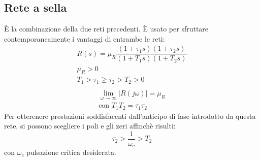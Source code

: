 \documentclass[a4paper]{report}
\begin{document}
\subsection{Rete a sella}
\`E la combinazione della due reti precedenti. \`E usato per sfruttare
contemporaneamente i vantaggi di entrambe le reti:
\begin{equation}
  \begin{array}{l}
  R(s) = \mu_R \dfrac{(1 + \tau_1 s)(1 + \tau_2 s)}{(1 + T_1 s)(1 +
    T_2 s)}\\
  \mu_R > 0\\
  T_1 > \tau_1 \geq \tau_2 > T_2 > 0\\
  \end{array}
\end{equation}
\begin{equation}
  \begin{array}{l}
    \lim_{\omega \to \infty} |R(j \omega)| = \mu_R\\
    \textrm{con } T_1T_2 = \tau_1 \tau_2
  \end{array}
\end{equation}
Per otterenere prestazioni soddisfacenti dall'anticipo di fase
introdotto da questa rete, si possono scegliere i poli e gli zeri
affinch\`e risulti:
\[
\tau_2 > \dfrac{1}{\omega_c} > T_2
\]
con $\omega_c$ pulsazione critica desiderata.
\begin{figure}[!h]
  \centering
  \caption{}
  \label{fig:}
\end{figure}


\begin{figure}[!hbp]
  \begin{center}
    \caption{}\label{fig:}
  \end{center}
\end{figure} 
\end{document}
